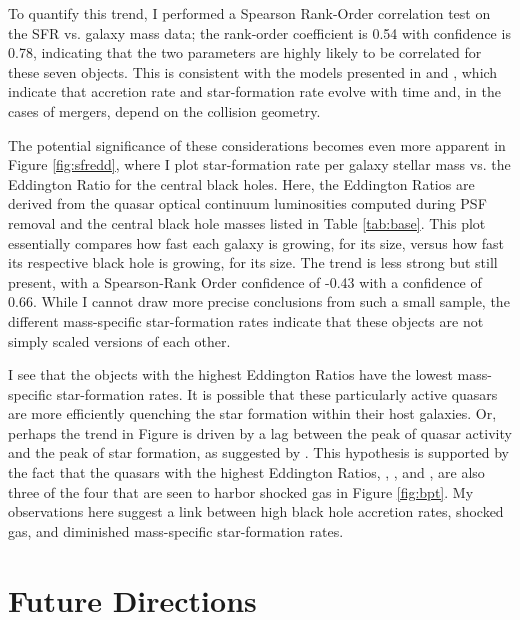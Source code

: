 To quantify this trend, I performed a Spearson Rank-Order correlation test \citep{NumericalRecipes} on the SFR vs. galaxy mass data; the rank-order coefficient is 0.54 with confidence is 0.78, indicating that the two parameters are highly likely to be correlated for these seven objects.  This is consistent with the models presented in \cite{DiMatteo} and \cite{Springel}, which indicate that accretion rate and star-formation rate evolve with time and, in the cases of mergers, depend on the collision geometry.

The potential significance of these considerations becomes even more apparent in Figure \ref{fig:sfredd}, where I plot star-formation rate per galaxy stellar mass vs. the Eddington Ratio for the central black holes. Here, the Eddington Ratios are derived from the quasar optical continuum luminosities computed during PSF removal and the central black hole masses listed in Table \ref{tab:base}.  This plot essentially compares how fast each galaxy is growing, for its size, versus how fast its respective black hole is growing, for its size.  The trend is less strong but still present, with a Spearson-Rank Order confidence of -0.43 with a confidence of 0.66. While I cannot draw more precise conclusions from such a small sample, the different mass-specific star-formation rates indicate that these objects are not simply scaled versions of each other.

I see that the objects with the highest Eddington Ratios have the lowest mass-specific star-formation rates.  It is possible that these particularly active quasars are more efficiently quenching the star formation within their host galaxies.  Or, perhaps the trend in Figure  is driven by a lag between the peak of quasar activity and the peak of star formation, as suggested by \cite{Hopkins2008}.  This hypothesis is supported by the fact that the quasars with the highest Eddington Ratios, , , and , are also three of the four that are seen to harbor shocked gas in Figure \ref{fig:bpt}.  My observations here suggest a link between high black hole accretion rates, shocked gas, and diminished mass-specific star-formation rates.  

\section{Future Directions}

